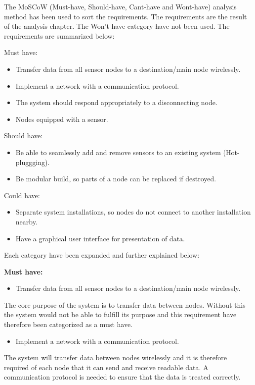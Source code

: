 The MoSCoW (Must-have, Should-have, Cant-have and Wont-have) analysis method has been used to sort the requirements. The requirements are the result of the analysis chapter. The Won't-have category have not been used. The requirements are summarized below:


Must have:
\begin{itemize}
\item Transfer data from all sensor nodes to a destination/main node wirelessly.
\item Implement a network with a communication protocol.
\item The system should respond appropriately to a disconnecting node.
\item Nodes equipped with a sensor.
\end{itemize}

Should have:
\begin{itemize}
\item Be able to seamlessly add and remove sensors to an existing system (Hot-pluggging).
\item Be modular build, so parts of a node can be replaced if destroyed.
\end{itemize}

Could have:
\begin{itemize}
\item Separate system installations, so nodes do not connect to another installation nearby.
\item Have a graphical user interface for presentation of data.
\end{itemize}


Each category have been expanded and further explained below:

\textbf{Must have:}
\begin{itemize}
\item Transfer data from all sensor nodes to a destination/main node wirelessly.
\end{itemize}
The core purpose of the system is to transfer data between nodes. Without this the system would not be able to fulfill its purpose and this requirement have therefore been categorized as a must have.


\begin{itemize}
\item Implement a network with a communication protocol.
\end{itemize}
The system will transfer data between nodes wirelessly and it is therefore required of each node that it can send and receive readable data. A communication protocol is needed to ensure that the data is treated correctly.


